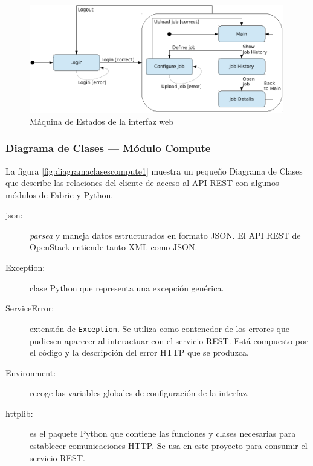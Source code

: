 \begin{figure}[tbp]
\begin{center}
\includegraphics[width=0.99\textwidth]{imagenes/026.pdf}
 \caption{M\'aquina de Estados de la interfaz web}
\label{fig:navegacion}
\end{center}
\end{figure}


\subsubsection{Diagrama de Clases --- M\'odulo Compute}\label{subsubsec:diagramaclasescompute}
\noindent La figura \ref{fig:diagramaclasescompute1} muestra un peque\~no Diagrama de Clases que describe las relaciones del cliente de acceso al API REST con algunos m\'odulos de Fabric y Python.

\begin{description}
 \item[json:] \emph{parsea} y maneja datos estructurados en formato JSON. El API REST de OpenStack entiende tanto XML como JSON.
 \item[Exception:] clase Python que representa una excepci\'on gen\'erica.
 \item[ServiceError:] extensi\'on de \texttt{Exception}. Se utiliza como contenedor de los errores que pudiesen aparecer al interactuar con el servicio REST. Est\'a compuesto por el c\'odigo y la descripci\'on del error HTTP que se produzca.
 \item[Environment:] recoge las variables globales de configuraci\'on de la interfaz.
 \item[httplib:] es el paquete Python que contiene las funciones y clases necesarias para establecer comunicaciones HTTP. Se usa en este proyecto para consumir el servicio REST.
\end{description}

